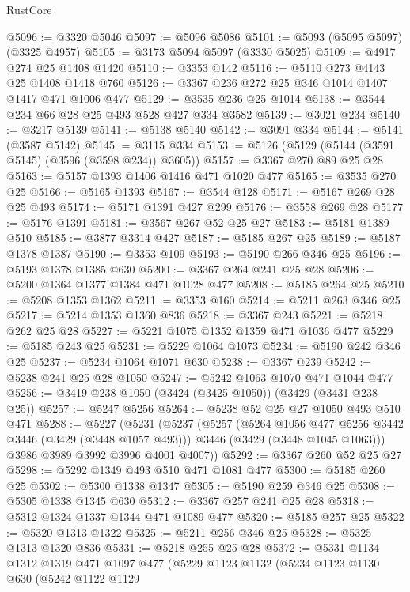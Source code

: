 \begin{lexlean}{RustCore}
\begin{coremodule}
@5096 := @3320 @5046
@5097 := @5096 @5086
@5101 := @5093 (@5095 @5097) (@3325 @4957)
@5105 := @3173 @5094 @5097 (@3330 @5025)
@5109 := @4917 @274 @25 @1408 @1420
@5110 := @3353 @142
@5116 := @5110 @273 @4143 @25 @1408 @1418 @760
@5126 := @3367 @236 @272 @25 @346 @1014 @1407 @1417 @471 @1006 @477
@5129 := @3535 @236 @25 @1014
@5138 := @3544 @234 @66 @28 @25 @493 @528 @427 @334 @3582
@5139 := @3021 @234
@5140 := @3217 @5139
@5141 := @5138 @5140
@5142 := @3091 @334
@5144 := @5141 (@3587 @5142)
@5145 := @3115 @334
@5153 := @5126 (@5129 (@5144 (@3591 @5145) (@3596 (@3598 @234)) @3605))
@5157 := @3367 @270 @89 @25 @28
@5163 := @5157 @1393 @1406 @1416 @471 @1020 @477
@5165 := @3535 @270 @25
@5166 := @5165 @1393
@5167 := @3544 @128
@5171 := @5167 @269 @28 @25 @493
@5174 := @5171 @1391 @427 @299
@5176 := @3558 @269 @28
@5177 := @5176 @1391
@5181 := @3567 @267 @52 @25 @27
@5183 := @5181 @1389 @510
@5185 := @3877 @3314 @427
@5187 := @5185 @267 @25
@5189 := @5187 @1378 @1387
@5190 := @3353 @109
@5193 := @5190 @266 @346 @25
@5196 := @5193 @1378 @1385 @630
@5200 := @3367 @264 @241 @25 @28
@5206 := @5200 @1364 @1377 @1384 @471 @1028 @477
@5208 := @5185 @264 @25
@5210 := @5208 @1353 @1362
@5211 := @3353 @160
@5214 := @5211 @263 @346 @25
@5217 := @5214 @1353 @1360 @836
@5218 := @3367 @243
@5221 := @5218 @262 @25 @28
@5227 := @5221 @1075 @1352 @1359 @471 @1036 @477
@5229 := @5185 @243 @25
@5231 := @5229 @1064 @1073
@5234 := @5190 @242 @346 @25
@5237 := @5234 @1064 @1071 @630
@5238 := @3367 @239
@5242 := @5238 @241 @25 @28 @1050
@5247 := @5242 @1063 @1070 @471 @1044 @477
@5256 := @3419 @238 @1050 (@3424 (@3425 @1050)) (@3429 (@3431 @238 @25))
@5257 := @5247 @5256
@5264 := @5238 @52 @25 @27 @1050 @493 @510 @471
@5288 := @5227
    (@5231
      (@5237
        (@5257
          (@5264 @1056 @477 @5256 @3442 @3446 (@3429 (@3448 @1057 @493)))
          @3446
          (@3429 (@3448 @1045 @1063)))
        @3986
        @3989
        @3992
        @3996
        @4001
        @4007))
@5292 := @3367 @260 @52 @25 @27
@5298 := @5292 @1349 @493 @510 @471 @1081 @477
@5300 := @5185 @260 @25
@5302 := @5300 @1338 @1347
@5305 := @5190 @259 @346 @25
@5308 := @5305 @1338 @1345 @630
@5312 := @3367 @257 @241 @25 @28
@5318 := @5312 @1324 @1337 @1344 @471 @1089 @477
@5320 := @5185 @257 @25
@5322 := @5320 @1313 @1322
@5325 := @5211 @256 @346 @25
@5328 := @5325 @1313 @1320 @836
@5331 := @5218 @255 @25 @28
@5372 := @5331
    @1134
    @1312
    @1319
    @471
    @1097
    @477
    (@5229
      @1123
      @1132
      (@5234
        @1123
        @1130
        @630
        (@5242
          @1122
          @1129

\end{coremodule}
\end{lexlean}
